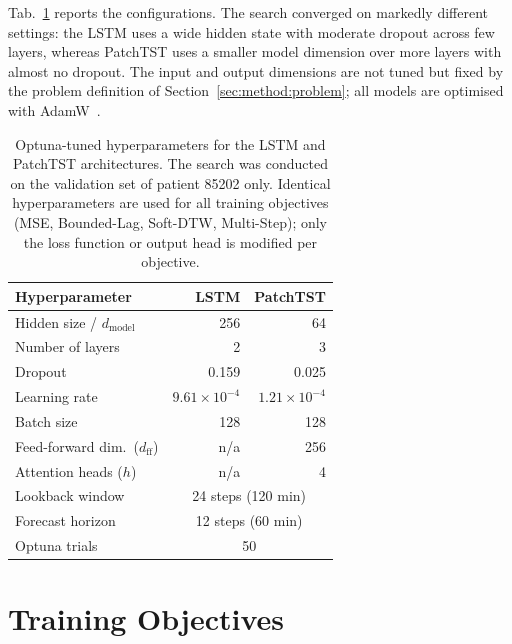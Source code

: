 Tab.~\ref{tab:method:hyperparams} reports the configurations. The search converged on markedly different settings: the LSTM uses a wide hidden state with moderate dropout across few layers, whereas PatchTST uses a smaller model dimension over more layers with almost no dropout. The input and output dimensions are not tuned but fixed by the problem definition of Section~\ref{sec:method:problem}; all models are optimised with AdamW~\citep{loshchilov2019adamw}.

\begin{table}[tbp]
\centering
\caption[Optuna-tuned hyperparameters]{Optuna-tuned hyperparameters for the LSTM and PatchTST architectures. The search was conducted on the validation set of patient 85202 only. Identical hyperparameters are used for all training objectives (MSE, Bounded-Lag, Soft-DTW, Multi-Step); only the loss function or output head is modified per objective.}
\label{tab:method:hyperparams}
\begin{tabular}{lrr}
\toprule
Hyperparameter & LSTM & PatchTST \\
\midrule
Hidden size / $d_\text{model}$      & 256     & 64 \\
Number of layers                     & 2       & 3 \\
Dropout                              & 0.159   & 0.025 \\
Learning rate                        & $9.61 \times 10^{-4}$ & $1.21 \times 10^{-4}$ \\
Batch size                           & 128     & 128 \\
Feed-forward dim.\ ($d_\text{ff}$)  & n/a     & 256 \\
Attention heads ($h$)                & n/a     & 4 \\
Lookback window                      & \multicolumn{2}{c}{24 steps (120 min)} \\
Forecast horizon                     & \multicolumn{2}{c}{12 steps (60 min)} \\
Optuna trials                        & \multicolumn{2}{c}{50} \\
\bottomrule
\end{tabular}
\end{table}


\section{Training Objectives} \label{sec:method:objectives}

